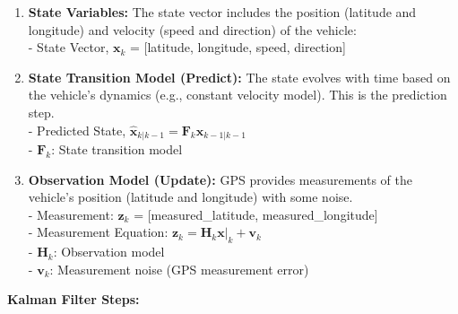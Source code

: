 \documentclass[12pt]{book}
\theoremstyle{definition}
\begin{document}
\begin{enumerate}
    \item \textbf{State Variables:} The state vector includes the position (latitude and longitude) and velocity (speed and direction) of the vehicle:\\ 
   - State Vector, $\mathbf{x}_k$ = [latitude, longitude, speed, direction]
   \item \textbf{State Transition Model (Predict):} The state evolves with time based on the vehicle's dynamics (e.g., constant velocity model). This is the prediction step.\\
      - Predicted State, $\mathbf{\hat{x}}_{k|k-1} = \mathbf{F}_k \mathbf{x}_{k-1|k-1}$\\
   - $\mathbf{F}_k$: State transition model
   
    \item \textbf{Observation Model (Update):} GPS provides measurements of the vehicle's position (latitude and longitude) with some noise.\\
   - Measurement: \(\mathbf{z}_k\) = [measured\_latitude, measured\_longitude]\\
   - Measurement Equation: $\mathbf{z}_k = \mathbf{H}_k \mathbf{x}|_k + \mathbf{v}_k$\\
   - $\mathbf{H}_k$: Observation model\\
   - $\mathbf{v}_k$: Measurement noise (GPS measurement error)

\end{enumerate}

\bigskip


\textbf{Kalman Filter Steps:}
\end{document}
